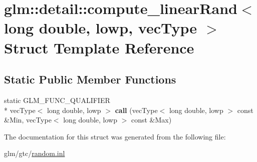 \hypertarget{structglm_1_1detail_1_1compute__linearRand_3_01long_01double_00_01lowp_00_01vecType_01_4}{\section{glm\-:\-:detail\-:\-:compute\-\_\-linear\-Rand$<$ long double, lowp, vec\-Type $>$ Struct Template Reference}
\label{structglm_1_1detail_1_1compute__linearRand_3_01long_01double_00_01lowp_00_01vecType_01_4}
}
\subsection*{Static Public Member Functions}
\begin{DoxyCompactItemize}
\item 
\hypertarget{structglm_1_1detail_1_1compute__linearRand_3_01long_01double_00_01lowp_00_01vecType_01_4_a946041e54f74d77bc7ca81ae69eaaffc}{static G\-L\-M\-\_\-\-F\-U\-N\-C\-\_\-\-Q\-U\-A\-L\-I\-F\-I\-E\-R \\*
vec\-Type$<$ long double, lowp $>$ {\bfseries call} (vec\-Type$<$ long double, lowp $>$ const \&Min, vec\-Type$<$ long double, lowp $>$ const \&Max)}\label{structglm_1_1detail_1_1compute__linearRand_3_01long_01double_00_01lowp_00_01vecType_01_4_a946041e54f74d77bc7ca81ae69eaaffc}

\end{DoxyCompactItemize}


The documentation for this struct was generated from the following file\-:\begin{DoxyCompactItemize}
\item 
glm/gtc/\hyperlink{random_8inl}{random.\-inl}\end{DoxyCompactItemize}
